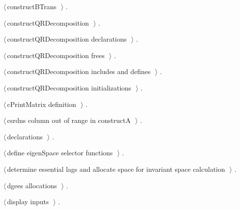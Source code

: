 \documentclass{article}
\begin{document}
{\begin{list}{}{\setlength{\itemsep}{-\parsep}\setlength{\itemindent}{-\leftmargin}}
\item $\langle\,$constructBTrans\nobreak\ {\footnotesize {}}$\,\rangle$ {\footnotesize {\NWtxtRefIn} .}
\item $\langle\,$constructQRDecomposition\nobreak\ {\footnotesize {}}$\,\rangle$ {\footnotesize {\NWtxtRefIn} .}
\item $\langle\,$constructQRDecomposition declarations\nobreak\ {\footnotesize {}}$\,\rangle$ {\footnotesize {\NWtxtRefIn} .}
\item $\langle\,$constructQRDecomposition frees\nobreak\ {\footnotesize {}}$\,\rangle$ {\footnotesize {\NWtxtRefIn} .}
\item $\langle\,$constructQRDecomposition includes and defines\nobreak\ {\footnotesize {}}$\,\rangle$ {\footnotesize {\NWtxtRefIn} .}
\item $\langle\,$constructQRDecomposition initializations\nobreak\ {\footnotesize {}}$\,\rangle$ {\footnotesize {\NWtxtRefIn} .}
\item $\langle\,$cPrintMatrix definition\nobreak\ {\footnotesize {}}$\,\rangle$ {\footnotesize {\NWtxtRefIn} .}
\item $\langle\,$csrdns column out of range in constructA\nobreak\ {\footnotesize {}}$\,\rangle$ {\footnotesize {\NWtxtRefIn} .}
\item $\langle\,$declarations\nobreak\ {\footnotesize {}}$\,\rangle$ {\footnotesize {\NWtxtRefIn} .}
\item $\langle\,$define eigenSpace selector functions\nobreak\ {\footnotesize {}}$\,\rangle$ {\footnotesize {\NWtxtRefIn} .}
\item $\langle\,$determine essential lags and allocate space for invariant space calculation\nobreak\ {\footnotesize {}}$\,\rangle$ {\footnotesize {\NWtxtRefIn} .}
\item $\langle\,$dgees allocations\nobreak\ {\footnotesize {}}$\,\rangle$ {\footnotesize {\NWtxtRefIn} .}
\item $\langle\,$display inputs\nobreak\ {\footnotesize {}}$\,\rangle$ {\footnotesize {\NWtxtRefIn} .
}
\end{list}}
\end{document}
